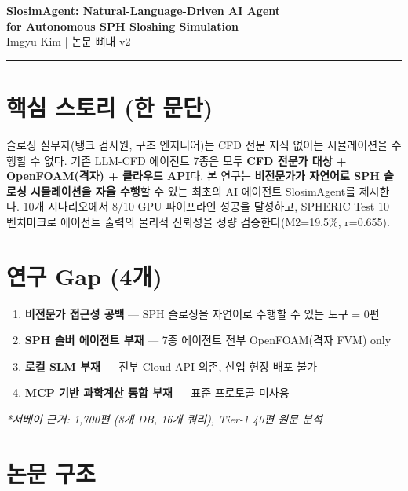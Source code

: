 \documentclass[11pt,a4paper]{article}
\begin{document}
\begin{center}
{\Large\bfseries SlosimAgent: Natural-Language-Driven AI Agent\\for Autonomous SPH Sloshing Simulation}\\[1em]
{\normalsize Imgyu Kim \quad | \quad 논문 뼈대 v2}
\end{center}

\vspace{0.5em}\hrule\vspace{1em}

\section{핵심 스토리 (한 문단)}

슬로싱 실무자(탱크 검사원, 구조 엔지니어)는 CFD 전문 지식 없이는 시뮬레이션을 수행할 수 없다.
기존 LLM-CFD 에이전트 7종은 모두 \textbf{CFD 전문가 대상 + OpenFOAM(격자) + 클라우드 API}다.
본 연구는 \textbf{비전문가가 자연어로 SPH 슬로싱 시뮬레이션을 자율 수행}할 수 있는 최초의 AI 에이전트 SlosimAgent를 제시한다.
10개 시나리오에서 8/10 GPU 파이프라인 성공을 달성하고,
SPHERIC Test 10 벤치마크로 에이전트 출력의 물리적 신뢰성을 정량 검증한다(M2=19.5\%, r=0.655).

\section{연구 Gap (4개)}

\begin{enumerate}[nosep,leftmargin=1.5em]
\item \textbf{비전문가 접근성 공백} --- SPH 슬로싱을 자연어로 수행할 수 있는 도구 = 0편
\item \textbf{SPH 솔버 에이전트 부재} --- 7종 에이전트 전부 OpenFOAM(격자 FVM) only
\item \textbf{로컬 SLM 부재} --- 전부 Cloud API 의존, 산업 현장 배포 불가
\item \textbf{MCP 기반 과학계산 통합 부재} --- 표준 프로토콜 미사용
\end{enumerate}

\textit{*서베이 근거: 1,700편 (8개 DB, 16개 쿼리), Tier-1 40편 원문 분석}

\section{논문 구조}
\end{document}
